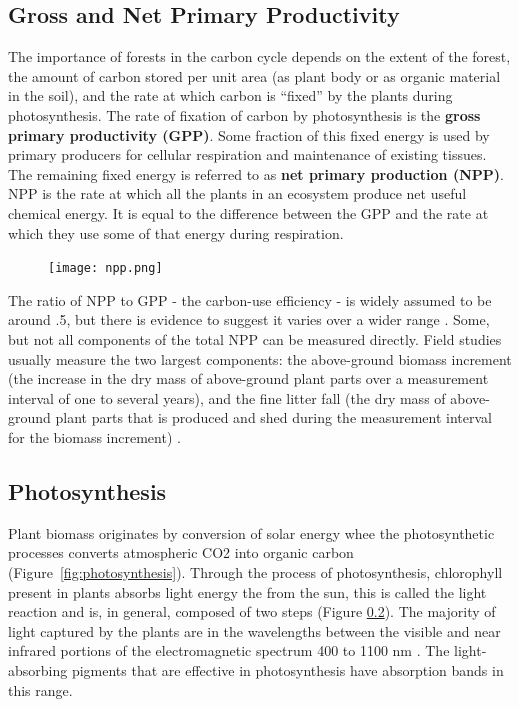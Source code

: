 \subsection{Gross and Net Primary Productivity}



The importance of forests in the carbon cycle depends on the extent of the forest, the amount of carbon stored per unit area (as plant body or as organic material in the soil), and the rate at which carbon is ``fixed'' by the plants during photosynthesis. The rate of fixation of carbon by photosynthesis is the \textbf{gross primary productivity (GPP)}. Some fraction of this fixed energy is used by primary producers for cellular respiration and maintenance of existing tissues. The remaining fixed energy is referred to as \textbf{net primary production (NPP)}. NPP is the rate at which all the plants in an ecosystem produce net useful chemical energy. It is equal to the difference between the GPP and the rate at which they use some of that energy during respiration\citep{corlett2014ecology}. 

\begin{figure}[ht]
    \centering
        \texttt{[image: npp.png]}
    \end{figure}

  The ratio of NPP to GPP - the carbon-use efficiency - is widely assumed to be around .5, but there is evidence to suggest it varies over a wider range \citep{delucia2007forest}. Some, but not all components of the total NPP can be measured directly. Field studies usually measure the two largest components: the above-ground biomass increment (the increase in the dry mass of above-ground plant parts over a measurement interval of one to several years), and the fine litter fall (the dry mass of above-ground plant parts that is produced and shed during the measurement interval for the biomass increment) \citep{ruimy1996turc}. 
  
\subsection{Photosynthesis}


Plant biomass originates by conversion of solar energy whee the photosynthetic processes converts atmospheric CO2 into organic carbon (Figure~\ref{fig:photosynthesis}). Through the process of \gls{photosynthesis}, chlorophyll present in plants absorbs light energy the from the sun, this is called the light reaction and is, in general, composed of two steps (Figure \ref{}). The majority of light captured by the plants are in the wavelengths between the visible and near infrared portions of the electromagnetic spectrum 400 to 1100 nm \citep{stenberg2010visible}. The light-absorbing pigments that are effective in photosynthesis have absorption bands in this range.

